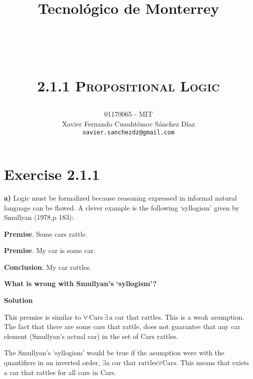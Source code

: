 \documentclass[titlepage, letterpaper, fleqn]{article}
\title{
\vspace{1in}
\textbf{Tecnológico de Monterrey} \\
\vspace{0.5in}
\textmd{\mahclass} \\
\large{\textit{\mahteacher}} \\
\vspace{0.5in}
\textsc{\mahtitle}\\
\textsc{2.1.1 Propositional Logic}\\
\author{01170065  - MIT \\
Xavier Fernando Cuauhtémoc Sánchez Díaz \\
\texttt{xavier.sanchezdz@gmail.com}}
\date{\mahdate}
}
\newcommand{\spacepls}{\vspace{5mm}}
\newcommand{\solution}{\textbf{\Large Solution}}
\begin{document}
\begin{titlepage}
\maketitle
\end{titlepage}

%
%

\section{Exercise 2.1.1}

{\large \textbf{a)} Logic must be formalized because reasoning expressed in informal natural language can be flawed. A clever example is the following `syllogism' given by Smullyan (1978,p 183):}

\spacepls

\textbf{Premise}. Some cars rattle.

\textbf{Premise}. My car is some car.

\textbf{Conclusion}. My car rattles.

\spacepls

\textbf{What is wrong with Smullyan's `syllogism'?}

\spacepls

\solution

This premise is similar to \(\forall \, \text{Cars} \, \exists \, \text{a car that rattles}\).
This is a weak asumption. The fact that there are some cars that rattle, does not guarantee that any car element (Smullyan's actual car) in the set of Cars rattles.

The Smullyan's `syllogism' would be true if the asumption were with the quantifiers in an inverted order, \(\exists \text{a car that rattles} \forall \text{Cars}\). This means that exists a car that rattles for all cars in Cars.
\end{document}
